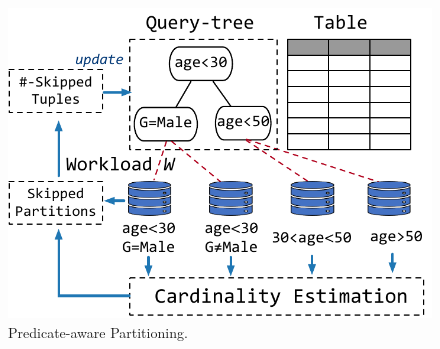 

\begin{figure}[htbp]
	\includegraphics[scale=0.6]{figures/partition}
	\centering
	\vspace{-1em}
	\caption{Predicate-aware Partitioning.}
	\label{fig:partition}
	\vspace{-1em}
\end{figure}



